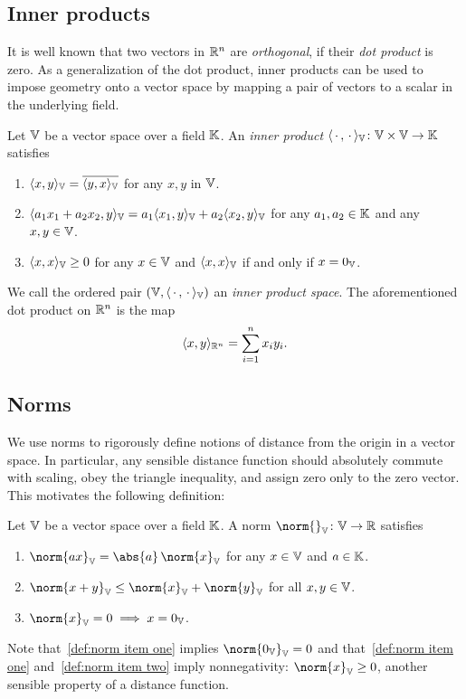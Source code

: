 \subsection{Inner products}
It is well known that two vectors in \( \mathbb{R}^n \) are \emph{orthogonal}, if their \emph{dot product} is zero.
As a generalization of the dot product, inner products can be used to impose geometry onto a vector space by mapping a pair of vectors to a scalar in the underlying field.
\begin{definition}%
	\label{def:inner product}
	Let \( \mathbb{V} \) be a vector space over a field \( \mathbb{K} \).
	An \emph{inner product} \( \langle \,\cdot\,, \,\cdot\, \rangle_{\mathbb{V}} \colon \mathbb{V} \times \mathbb{V} \to \mathbb{K} \) satisfies
	\begin{enumerate}
		\item \( \langle x, y \rangle_{\mathbb{V}} = \overline{\langle y, x \rangle_{\mathbb{V}}} \) for any \( x , y \) in \( \mathbb{V} \).
		\item \( \langle a_{\num{1}} x_{\num{1}} + a_{\num{2}} x_{\num{2}}, y \rangle_{\mathbb{V}} = a_{\num{1}}\langle x_{\num{1}}, y \rangle_{\mathbb{V}} + a_{\num{2}}\langle x_{\num{2}}, y \rangle_{\mathbb{V}} \) for any \( a_{\num{1}}, a_{\num{2}} \in \mathbb{K} \) and any \( x, y \in \mathbb{V} \).
		\item \( \langle x, x \rangle_{\mathbb{V}} \geq \num{0} \) for any \( x \in \mathbb{V} \) and \( \langle x, x \rangle_{\mathbb{V}} \) if and only if \( x = \num{0}_{\mathbb{V}} \).
	\end{enumerate}
\end{definition}
We call the ordered pair \( (\mathbb{V}, \langle \,\cdot\,, \,\cdot\, \rangle_{\mathbb{V}}) \) an \emph{inner product space}.
The aforementioned dot product on \( \mathbb{R}^n \) is the map
\begin{equation}
	\langle x, y \rangle_{\mathbb{R}^n} = \sum_{i={\num{1}}}^n x_i y_i.
\end{equation}
\subsection{Norms}
We use norms to rigorously define notions of distance from the origin in a vector space.
In particular, any sensible distance function should absolutely commute with scaling, obey the triangle inequality, and assign zero only to the zero vector.
This motivates the following definition:
\begin{definition}[Norm]%
	\label{def:norm}
	Let \( \mathbb{V} \) be a vector space over a field \( \mathbb{K} \).
	A norm \( \map{\norm{}_{\V}}{\V}{\R} \) satisfies
	\begin{enumerate}
		\item \( \norm{ax}_{\V} = \abs{a}\,\norm{x}_{\V} \) for any \( x \in \mathbb{V} \) and \( a \in \mathbb{K} \).\label{def:norm item one}
		\item \( \norm{x + y}_{\V} \leq \norm{x}_{\V} + \norm{y}_{\V} \) for all \( x, y \in \mathbb{V} \).\label{def:norm item two}
		\item \( \norm{x}_{\V} = \num{0} \implies x = \num{0}_{\V} \).
	\end{enumerate}
\end{definition}
Note that~\cref{def:norm item one} implies \( \norm{\num{0}_{\V}}_{\V} = \num{0} \) and that~\cref{def:norm item one} and~\cref{def:norm item two} imply nonnegativity: \( \norm{x}_{\V} \geq \num{0} \), another sensible property of a distance function.

